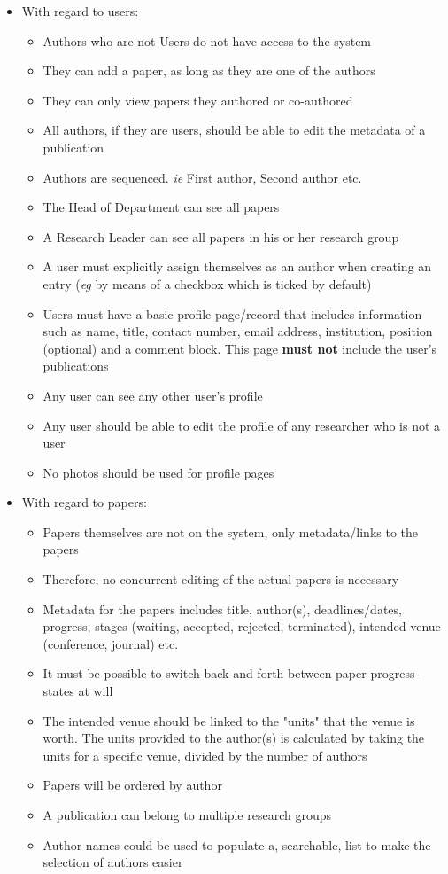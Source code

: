 \documentclass[a4paper,12pt]{article}
\begin{document}
\begin{itemize}
\item With regard to users:
\begin{itemize}
\item Authors who are not Users do not have access to the system
\item They can add a paper, as long as they are one of the authors
\item They can only view papers they authored or co-authored
\item All authors, if they are users, should be able to edit the metadata of a publication
\item Authors are sequenced. \textit{ie} First author, Second author etc.
\item The Head of Department can see all papers
\item A Research Leader can see all papers in his or her research group
\item A user must explicitly assign themselves as an author when creating an entry (\textit{eg} by means of a checkbox which is ticked by default)
\item Users must have a basic profile page/record that includes information such as name, 
title, contact number, email address, institution, position (optional) and a comment block. This page \textbf{must not} include the user's publications
\item Any user can see any other user's profile
\item Any user should be able to edit the profile of any researcher who is not a user
\item No photos should be used for profile pages
\end{itemize}

\item With regard to papers:
\begin{itemize}
\item Papers themselves are not on the system, only metadata/links to the papers
\item Therefore, no concurrent editing of the actual papers is necessary
\item Metadata for the papers includes title, author(s), deadlines/dates, progress, stages (waiting, accepted, rejected, terminated), intended venue (conference, journal) etc.
\item It must be possible to switch back and forth between paper progress-states at will
\item The intended venue should be linked to the "units" that the venue is worth. The units provided to the author(s) is calculated by taking the units for a specific venue, divided by the number of authors
\item Papers will be ordered by author
\item A publication can belong to multiple research groups
\item Author names could be used to populate a, searchable, list to make the selection of authors easier
\end{itemize}


\end{itemize}
\end{document}
